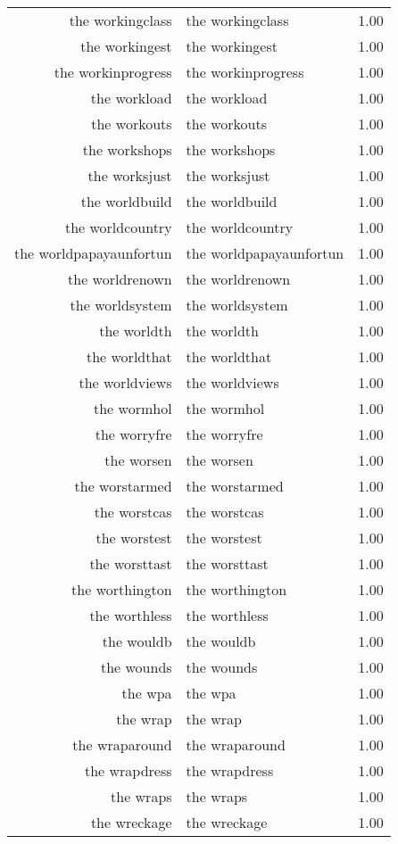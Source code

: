 \begin{table}[ht]
\begin{tabular}{rlr}
  the workingclass & the workingclass & 1.00 \\ 
  the workingest & the workingest & 1.00 \\ 
  the workinprogress & the workinprogress & 1.00 \\ 
  the workload & the workload & 1.00 \\ 
  the workouts & the workouts & 1.00 \\ 
  the workshops & the workshops & 1.00 \\ 
  the worksjust & the worksjust & 1.00 \\ 
  the worldbuild & the worldbuild & 1.00 \\ 
  the worldcountry & the worldcountry & 1.00 \\ 
  the worldpapayaunfortun & the worldpapayaunfortun & 1.00 \\ 
  the worldrenown & the worldrenown & 1.00 \\ 
  the worldsystem & the worldsystem & 1.00 \\ 
  the worldth & the worldth & 1.00 \\ 
  the worldthat & the worldthat & 1.00 \\ 
  the worldviews & the worldviews & 1.00 \\ 
  the wormhol & the wormhol & 1.00 \\ 
  the worryfre & the worryfre & 1.00 \\ 
  the worsen & the worsen & 1.00 \\ 
  the worstarmed & the worstarmed & 1.00 \\ 
  the worstcas & the worstcas & 1.00 \\ 
  the worstest & the worstest & 1.00 \\ 
  the worsttast & the worsttast & 1.00 \\ 
  the worthington & the worthington & 1.00 \\ 
  the worthless & the worthless & 1.00 \\ 
  the wouldb & the wouldb & 1.00 \\ 
  the wounds & the wounds & 1.00 \\ 
  the wpa & the wpa & 1.00 \\ 
  the wrap & the wrap & 1.00 \\ 
  the wraparound & the wraparound & 1.00 \\ 
  the wrapdress & the wrapdress & 1.00 \\ 
  the wraps & the wraps & 1.00 \\ 
  the wreckage & the wreckage & 1.00 \\ 

\end{tabular}
\end{table}
